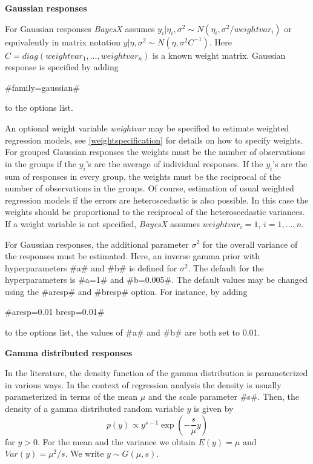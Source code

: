 {\bf Gaussian responses}

For Gaussian responses {\em BayesX} assumes $y_i | \eta_i,\sigma^2
\sim N(\eta_i,\sigma^2/weightvar_i)$ or equivalently in matrix
notation $y | \eta, \sigma^2 \sim N(\eta,\sigma^2C^{-1})$. Here
$C=diag(weightvar_1,\dots,weightvar_n)$ is a known weight matrix.
Gaussian response is specified by adding

#family=gaussian#

to the options list.

An optional weight variable {\em weightvar} may be specified to
estimate weighted regression models, see
\autoref{weightspecification} for details on how to specify
weights. For grouped Gaussian responses the weights must be the
number of observations in the groups if the $y_i$'s are the
average of individual responses. If the $y_i$'s are the sum of
responses in every group, the weights must be the reciprocal of
the number of observations in the groups. Of course, estimation of
usual weighted regression models if the errors are heteroscedastic
is also possible. In this case the weights should be proportional
to the reciprocal of the heteroscedastic variances. If a weight
variable is not specified, {\em BayesX} assumes $weightvar_i = 1$,
$i=1,\dots,n$.

For Gaussian responses, the additional parameter $\sigma^2$ for
the overall variance of the responses must be estimated. Here, an
inverse gamma prior with hyperparameters #a# and #b# is defined
for $\sigma^2$. The default for the hyperparameters is #a=1# and
#b=0.005#. The default values may be changed using the #aresp# and
#bresp# option. For instance, by adding

#aresp=0.01  bresp=0.01#

to the options list, the values of #a# and #b# are both set to
0.01.

{\bf Gamma distributed responses}

In the literature, the density function of the gamma distribution
is parameterized in various ways. In the context of regression
analysis the density is usually parameterized in terms of the mean
$\mu$ and the scale parameter #s#. Then, the density of a gamma
distributed random variable $y$ is given by
\begin{equation}
\label{gammapar1} p(y) \propto y^{s-1}\exp(-\frac{s}{\mu} y)
\end{equation}
for $y > 0$. For the mean and the variance we obtain $E(y) = \mu$
and $Var(y) = \mu^2/s$. We write $y \sim G(\mu,s)$.

